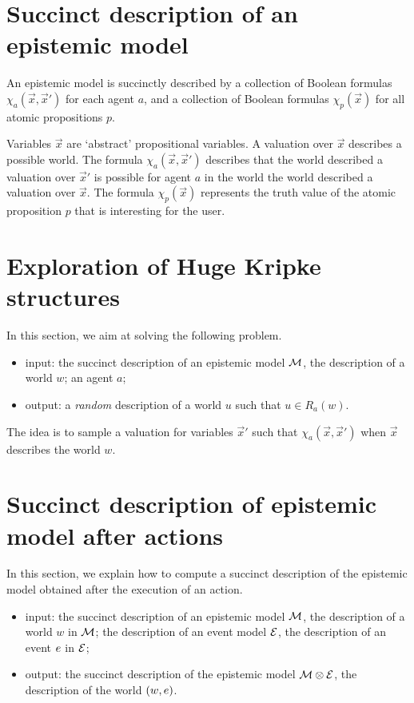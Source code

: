 \documentclass{article}
\begin{document}

\section{Succinct description of an epistemic model}

An epistemic model is succinctly described by a collection of Boolean formulas $\chi_a(\vec x, \vec x')$ for each agent $a$, and a collection of Boolean formulas $\chi_p(\vec x)$ for all atomic propositions $p$.

Variables $\vec x$ are `abstract' propositional variables. A valuation over $\vec x$ describes a possible world. The formula $\chi_a(\vec x, \vec x')$ describes that the world described a valuation over $\vec x'$ is possible for agent $a$ in the world  the world described a valuation over $\vec x$. The formula $\chi_p(\vec x)$ represents the truth value of the atomic proposition $p$ that is interesting for the user.


\section{Exploration of Huge Kripke structures}


In this section, we aim at solving the following problem.

\begin{itemize}
	\item input: the succinct description of an epistemic model $\mathcal M$, the description of a world $w$; an agent $a$;
	\item output: a \emph{random} description of a world $u$ such that $u \in R_a(w)$.
\end{itemize}

The idea is to sample a valuation for variables $\vec x'$ such that $\chi_a(\vec x, \vec x')$ when $\vec x$ describes the world $w$.



\section{Succinct description of epistemic model after actions}

In this section, we explain how to compute a succinct description of the epistemic model obtained after the execution of an action. 

\begin{itemize}
	\item input: the succinct description of an epistemic model $\mathcal M$, the description of a world $w$ in $\mathcal M$; the description of an event model $\mathcal E$, the description of an event $e$ in $\mathcal E$;
	\item output: the succinct description of the epistemic model $\mathcal M \otimes \mathcal E$, the description of the world $(w, e)$.
\end{itemize}
\end{document}

